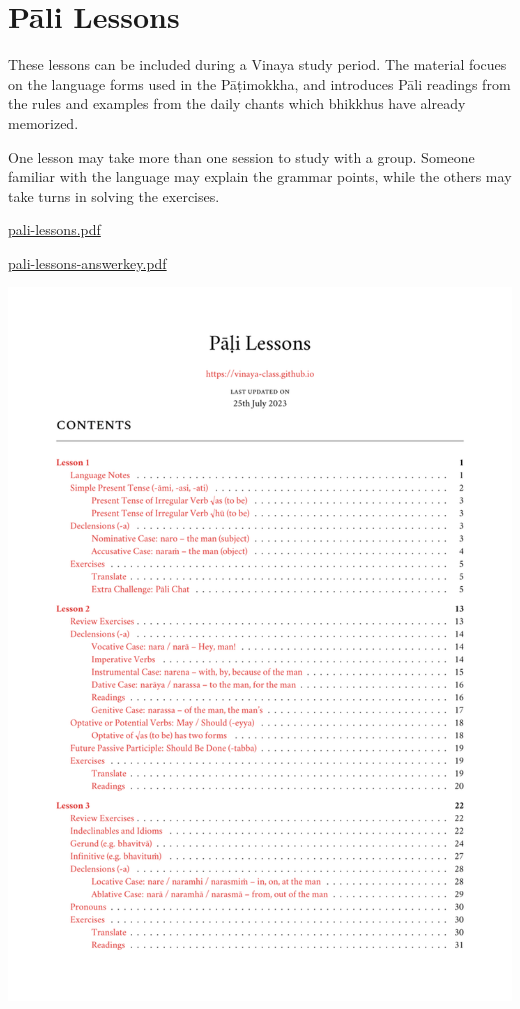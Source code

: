 \chapter{Pāli Lessons}

These lessons can be included during a Vinaya study period. The material
focues on the language forms used in the Pāṭimokkha, and introduces Pāli
readings from the rules and examples from the daily chants which
bhikkhus have already memorized.

One lesson may take more than one session to study with a group. Someone
familiar with the language may explain the grammar points, while the
others may take turns in solving the exercises.

\href{./includes/docs/pali-lessons.pdf}{pali-lessons.pdf}

\href{./includes/docs/pali-lessons-answerkey.pdf}{pali-lessons-answerkey.pdf}

\href{./includes/docs/pali-lessons.pdf}{\includegraphics{./includes/docs/pali-lessons-thumb.png}}

